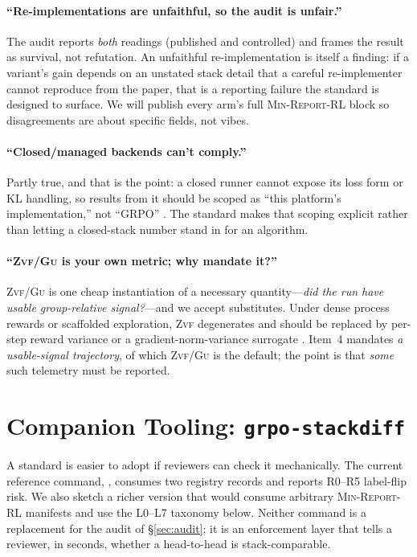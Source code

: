 \documentclass[11pt]{article}
\newcommand{\zvf}{\textsc{Zvf}}
\newcommand{\gu}{\textsc{Gu}}
\newcommand{\minreport}{\textsc{Min-Report-RL}}
\begin{document}
\paragraph{``Re-implementations are unfaithful, so the audit is unfair.''}
The audit reports \emph{both} readings (published and controlled) and frames the
result as survival, not refutation. An unfaithful re-implementation is itself a
finding: if a variant's gain depends on an unstated stack detail that a careful
re-implementer cannot reproduce from the paper, that is a reporting failure the
standard is designed to surface. We will publish every arm's full \minreport{}
block so disagreements are about specific fields, not vibes.

\paragraph{``Closed/managed backends can't comply.''}
Partly true, and that is the point: a closed runner cannot expose its loss form
or KL handling, so results from it should be scoped as ``this platform's
implementation,'' not ``GRPO'' \cite{zvfaudit2026}. The standard makes that
scoping explicit rather than letting a closed-stack number stand in for an
algorithm.

\paragraph{``\zvf{}/\gu{} is your own metric; why mandate it?''}
\zvf{}/\gu{} is one cheap instantiation of a necessary quantity---\emph{did the
run have usable group-relative signal?}---and we accept substitutes. Under
dense process rewards or scaffolded exploration, \zvf{} degenerates and should
be replaced by per-step reward variance or a gradient-norm-variance surrogate
\cite{zvfaudit2026}. Item~4 mandates \emph{a usable-signal trajectory}, of which
\zvf{}/\gu{} is the default; the point is that \emph{some} such telemetry must be
reported.

\section{Companion Tooling: \texttt{grpo-stackdiff}}
\label{sec:tooling}

A standard is easier to adopt if reviewers can check it mechanically. The
current reference command,
,
consumes two registry records and reports R0--R5 label-flip risk. We also sketch
a richer version that would consume arbitrary \minreport{} manifests and use
the L0--L7 taxonomy below. Neither command is a replacement for the audit of
\S\ref{sec:audit}; it is an enforcement layer that tells a reviewer, in
seconds, whether a head-to-head is stack-comparable.
\end{document}
